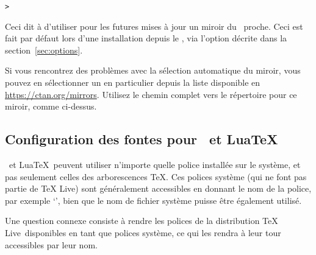 \documentclass[german, english, french]{article}
\renewcommand{\TL}{\TeX{} Live\xspace}%
\begin{document}
\begin{alltt}
> 
\end{alltt}

Ceci dit à  d'utiliser pour les futures mises à jour un miroir du
\CTAN\ proche. Ceci est fait par défaut lors d'une installation depuis le \DVD,
via l'option décrite dans la section~\ref{sec:options}.

Si vous rencontrez des problèmes avec la sélection automatique du miroir, vous
pouvez en sélectionner un en particulier depuis la liste disponible en
\url{https://ctan.org/mirrors}. Utilisez le chemin complet vers le répertoire
 pour ce miroir, comme ci-dessus.


\subsection{Configuration des fontes pour \protect\XeTeX\ et Lua\protect\TeX}
\label{sec:font-conf-sys}

\XeTeX\ et Lua\TeX\ peuvent utiliser n'importe quelle police installée sur le
système, et pas seulement celles des arborescences \TeX. Ces polices système
(qui ne font pas partie de \TL) sont généralement accessibles en donnant le nom
de la police, par exemple `', bien que le nom de fichier
système puisse être également utilisé.

Une question connexe consiste à rendre les polices de la distribution \TL\
disponibles en tant que polices système, ce qui les rendra à leur tour
accessibles par leur nom.
\end{document}

